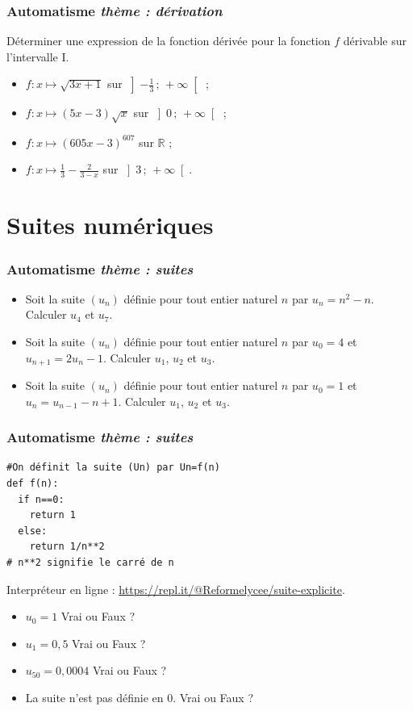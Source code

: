 \documentclass[11pt]{beamer}
\newcommand{\R}{\mathbb{R}}
\newcommand{\Interoo}[2]{\left]#1\, ;\, #2\right[}
\newcommand{\suite}[1]{\ensuremath{\left(#1_{n}\right)}}
\newcounter{autocompteur}
\newcommand{\automatisme}[1]{\addtocounter{autocompteur}{1}\frametitle{Automatisme  \theautocompteur  \textit{ thème : #1}}}
\begin{document}
\begin{frame}
\automatisme{dérivation}

Déterminer une expression de la fonction dérivée pour la fonction $f$ dérivable sur l'intervalle I.
\begin{itemize}
\item $f:x \mapsto \sqrt{3x+1}$ sur $\Interoo{-\frac{1}{3}}{+\infty}$ ;
 \item $f:x \mapsto (5x-3)\sqrt{x}$ sur $\Interoo{0}{+\infty}$ ;
 \item $f:x \mapsto \left(605x-3\right)^{607}$ sur $\R$ ; 
 \item $f:x \mapsto \frac{1}{3}-\frac{2}{3-x}$ sur $\Interoo{3}{+\infty}$.
\end{itemize}

\end{frame}




\section{Suites numériques}



\begin{frame}
\automatisme{suites}


\begin{itemize}
\item Soit la suite $\suite{u}$ définie pour tout entier naturel $n$ par $u_{n}=n^{2}-n$. Calculer $u_{4}$ et $u_{7}$.
 \item Soit la suite $\suite{u}$ définie pour tout entier naturel $n$ par $u_{0}=4$ et $u_{n+1}=2u_{n}-1$. Calculer $u_{1}$, $u_{2}$ et $u_{3}$.
 \item Soit la suite $\suite{u}$ définie pour tout entier naturel $n$ par $u_{0}=1$ et $u_{n}=u_{n-1}-n+1$. Calculer $u_{1}$, $u_{2}$ et $u_{3}$.
\end{itemize}

\end{frame}


\begin{frame}[fragile]
\automatisme{suites}
\begin{lstlisting}
#On définit la suite (Un) par Un=f(n)
def f(n):
  if n==0:
    return 1
  else:
    return 1/n**2  
# n**2 signifie le carré de n
\end{lstlisting}

Interpr\'eteur en ligne : \url{https://repl.it/@Reformelycee/suite-explicite}.

\begin{itemize}
	\item $u_{0}=1$ Vrai ou Faux ?
	\item $u_{1}=0,5$ Vrai ou Faux ?
	\item $u_{50}=0,0004$ Vrai ou Faux ?
	\item La suite n'est pas d\'efinie en $0$. Vrai ou Faux ?
\end{itemize}
\end{frame}
\end{document}
